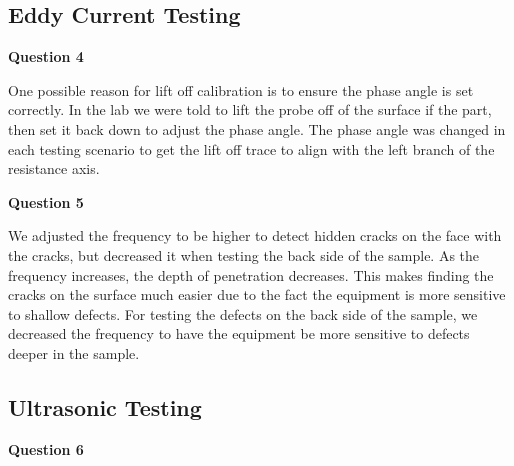 \documentclass[12 pt]{report}
\begin{document}
\subsection{Eddy Current Testing} \label{eddy_current_testing}
\textbf{Question 4}

One possible reason for lift off calibration is to ensure the phase angle is set correctly. In the lab we were told to lift the probe off of the surface if the part, then set it back down to adjust the phase angle. The phase angle was changed in each testing scenario to get the lift off trace to align with the left branch of the resistance axis.

\textbf{Question 5}

We adjusted the frequency to be higher to detect hidden cracks on the face with the cracks, but decreased it when testing the back side of the sample. As the frequency increases, the depth of penetration decreases. This makes finding the cracks on the surface much easier due to the fact the equipment is more sensitive to shallow defects. For testing the defects on the back side of the sample, we decreased the frequency to have the equipment be more sensitive to defects deeper in the sample.

\subsection{Ultrasonic Testing} \label{ultrasonic_testing}
\textbf{Question 6}
\end{document}

